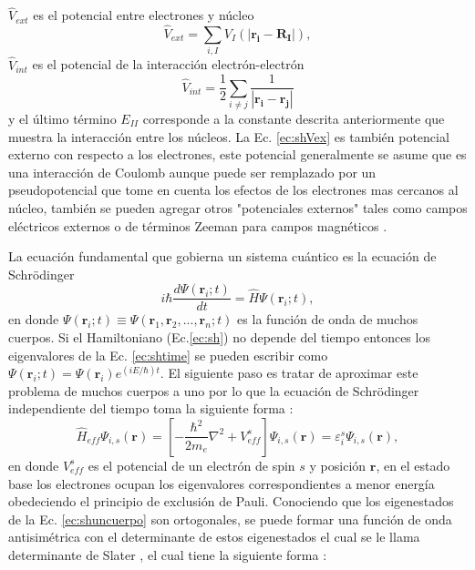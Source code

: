 	$\hat{V}_{ext}$ es el potencial entre electrones y n\'ucleo
	\begin{equation}
	\hat{V}_{ext} = \sum_{i,I} V_I (|\pmb{r_i}-\pmb{R_I}|), \label{ec:shVex}
	\end{equation}
	$\hat{V}_{int}$ es el potencial de la interacci\'on electr\'on-electr\'on
	\begin{equation}
	\hat{V}_{int} = \frac{1}{2} \sum_{i \not= j} \frac{1}{|\pmb{r_i}-\pmb{r_j}|} \label{ec:shVint}
	\end{equation}
	y el \'ultimo  t\'ermino $E_{II}$ corresponde a la constante descrita anteriormente que muestra la interacci\'on entre los n\'ucleos. La Ec. \ref{ec:shVex} es tambi\'en potencial externo con respecto a los electrones, este potencial generalmente se asume que es una interacci\'on de Coulomb aunque puede ser remplazado por un pseudopotencial que tome en cuenta los efectos de los electrones mas cercanos al n\'ucleo, tambi\'en se  pueden agregar otros "potenciales externos"  tales como campos el\'ectricos externos o de t\'erminos Zeeman para campos magn\'eticos \cite{Martin-2004}. 
	\newline
	\par La ecuaci\'on fundamental que gobierna un sistema cu\'antico es la ecuaci\'on de Schr\"odinger \cite{Martin-2004}
	\begin{equation}
	i \hbar \frac{d \Psi ({\pmb{r}_i}; t)}{dt} = \hat H \Psi ({\pmb{r}_i}; t), \label{ec:shtime}
	\end{equation}
	en donde $\Psi ({\pmb{r}_i}; t) \equiv \Psi ({\pmb{r}_1, \pmb{r}_2, ... ,\pmb{r}_n }; t) $ es la funci\'on de onda de muchos cuerpos. Si el Hamiltoniano (Ec.\ref{ec:sh}) no depende del tiempo entonces los eigenvalores de la Ec. \ref{ec:shtime} se pueden escribir como $ \Psi ({\pmb{r}_i}; t) =  \Psi ({\pmb{r}_i}) e^{(i E/ \hbar) t} $. El siguiente paso es tratar de aproximar este problema de muchos cuerpos a uno por lo que la  ecuaci\'on de Schr\"odinger independiente del tiempo toma la siguiente forma \cite{Martin-2004}:
	\begin{equation}
	\hat H _{eff} \Psi_{i,s} (\pmb{r}) = \left [ -\frac{\hbar^2}{2m_e} \nabla^2 + V_{eff}^{s} \right]\Psi_{i,s} (\pmb{r}) = \varepsilon_i ^{s} \Psi_{i,s} (\pmb{r}),  \label{ec:shuncuerpo}
	\end{equation}
	en donde $V_{eff}^{s}$ es el potencial de un electr\'on de spin $s$ y posici\'on $\pmb{r}$, en el estado base los electrones ocupan los eigenvalores correspondientes a menor energ\'ia obedeciendo el principio de exclusi\'on de Pauli. Conociendo que los eigenestados de la Ec. \ref{ec:shuncuerpo} son ortogonales, se puede formar una funci\'on de onda antisim\'etrica con el determinante de estos eigenestados el cual se le llama determinante de Slater \cite{Faustino-2014}, el cual tiene la siguiente forma \cite{Martin-2004}:
